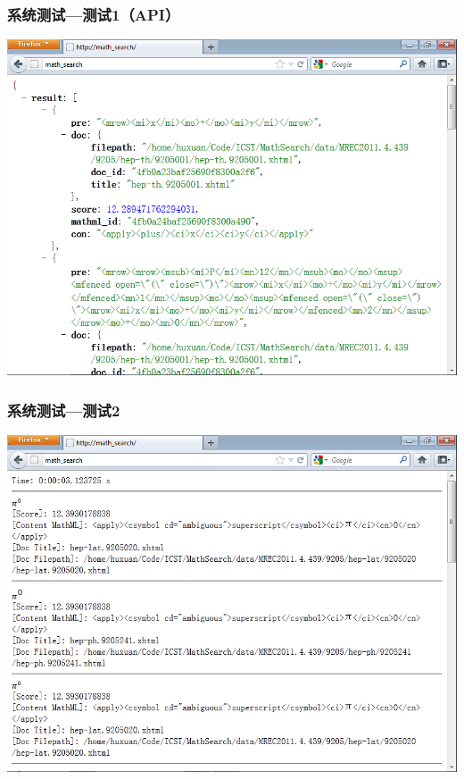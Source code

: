 \documentclass[17pt]{beamer}
\begin{document}
    \begin{frame}
        \frametitle{系统测试---测试1（API）}
        \begin{center}
            \includegraphics[width=.7\paperwidth]{pic/test1_api.png}
        \end{center}
    \end{frame}

    \begin{frame}
        \frametitle{系统测试---测试2}
        \begin{center}
            \includegraphics[width=.7\paperwidth]{pic/test2.png}
        \end{center}
    \end{frame}
\end{document}
